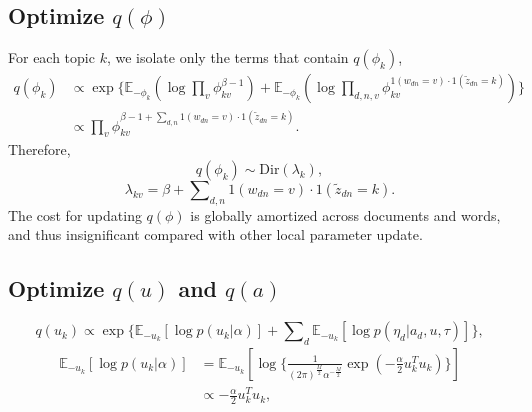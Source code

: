\documentclass[sigconf]{acmart}
\renewcommand*{\bm}[1]{#1}%
\begin{document}
\begin{appendices}
\subsection{Optimize $q(\bm{\phi})$}
For each topic $k$, we isolate only the terms that contain $q(\bm{\phi}_k)$,
\begin{equation}
\label{}
\begin{split}
q(\bm{\phi}_k) &\propto \exp\big\{\mathbb{E}_{-\bm{\phi}_k}(\log \prod\nolimits_v\phi_{kv}^{\beta-1} ) + \mathbb{E}_{-\bm{\phi}_k}(\log\prod\nolimits_{d, n, v}\phi_{kv}^{\bm{1}(w_{dn}=v)\cdot\bm{1}(\tilde{z}_{dn}=k)})\big\}\\
&\propto \prod\nolimits_v\phi_{kv}^{\beta-1+\sum\nolimits_{d,n}\bm{1}(w_{dn}=v)\cdot\bm{1}(\tilde{z}_{dn}=k)}.
\end{split}
\end{equation}
Therefore,
\begin{equation}
\label{ }
q(\bm{\phi}_k) \sim \text{Dir}(\bm{\lambda}_k),
\end{equation}
\begin{equation}
\label{suppeq:vi-lambda}
\lambda_{kv} = \beta + \sum\nolimits_{d,n}\bm{1}(w_{dn}=v)\cdot \bm{1}(\tilde{z}_{dn}=k).
\end{equation}
The cost for updating $q(\bm{\phi})$ is globally amortized across documents and words, and thus insignificant compared with other local parameter update.


\subsection{Optimize $q(\bm{u})$ and $q(\bm{a})$}
\begin{equation}
\label{ }
q(\bm{u}_k) \propto \exp\big\{ \mathbb{E}_{-\bm{u}_k}\left[\log p(\bm{u}_k | \alpha)\right] + \sum\nolimits_d\mathbb{E}_{-\bm{u}_k}\left[\log p(\bm{\eta}_d | \bm{a}_d, \bm{u}, \tau)\right]\big\},
\end{equation}
\begin{equation}
\label{ }
\begin{split}
\mathbb{E}_{-\bm{u}_k}\left[\log p(\bm{u}_k | \alpha)\right] &= \mathbb{E}_{-\bm{u}_k}\left[\log \big\{\frac{1}{(2\pi)^{\frac{M}{2}}\alpha^{-\frac{M}{2}}}\exp(-\frac{\alpha}{2}\bm{u}_k^T\bm{u}_k)\big\}\right]\\
&\propto -\frac{\alpha}{2}\bm{u}_k^T\bm{u}_k,
\end{split}
\end{equation}


\end{appendices}
\end{document}
